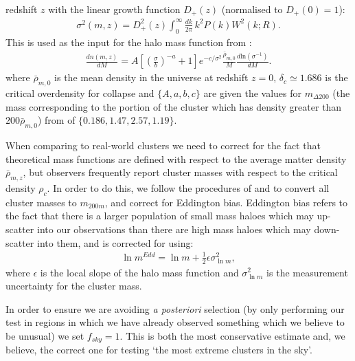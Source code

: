\documentclass[twocolumn,useAMS,usenatbib,usegraphicx]{mn2e}
\begin{document}
redshift $z$ with the linear growth function $D_{+}(z)$ (normalised
to $D_{+}(0)=1$):
\begin{eqnarray}
\label{eqn:sigsquare}
    \sigma^2(m,z) = D_{+}^2(z)\int_{0}^{\infty} \frac{dk}{2\pi} \, k^2 P(k) W^2(k; R).
\end{eqnarray}
This is used as the input for the halo mass function from \cite{Tinker2008}:
\begin{eqnarray}
\label{eqn:hmfs:general_hmf}
    \frac{dn(m, z)}{dM} =  A\left[ \left(\frac{\sigma}{b}\right)^{-a} + 1\right] e^{ -c/\sigma^2} \frac{\bar{\rho}_{m,0}}{M} \frac{d \mathrm{ln}(\sigma^{-1})}{dM}.
\end{eqnarray}
where $\bar{\rho}_{m,0}$ is the mean density in the universe at
redshift $z=0$, $\delta_c \simeq 1.686$ is the critical overdensity
for collapse and $\lbrace A, a, b, c\rbrace$ are given the values
for $m_{\Delta200}$ (the mass corresponding to the portion of the
cluster which has density greater than $200\bar{\rho}_{m,0}$) from
\cite{Tinker2008} of $\lbrace 0.186, 1.47, 2.57, 1.19\rbrace$.

When comparing to real-world clusters we need to correct for the
fact that theoretical mass functions are defined with respect to the
average matter density $\bar{\rho}_{m,z}$, but observers frequently
report cluster masses with respect to the critical density $\rho_c$.
In order to do this, we follow the procedures of
\cite{Waizmann2011a} and \cite{Mortonson2011} to convert all cluster
masses to  $m_{200m}$, and correct for Eddington bias.
Eddington bias refers to the fact that there is a larger population
of small mass haloes which may up-scatter into our observations than
there are high mass haloes which may down-scatter into them, and is
corrected for using:
\begin{eqnarray}
\label{eqn:edd}
\ln m^{Edd} = \ln m + \frac{1}{2}\epsilon \sigma_{\ln m}^{2},
\end{eqnarray}
where $\epsilon$ is the local slope of the halo mass function and
$\sigma_{\ln m}^{2}$ is the measurement uncertainty for the cluster
mass.

In order to ensure we are avoiding \textit{a posteriori} selection
(by only performing our test in regions in which we have already
observed something which we believe to be unusual) we set
$f_{sky}=1$. This is both the most conservative estimate and, we
believe, the correct one for testing `the most extreme clusters in
the sky'.
\end{document}
